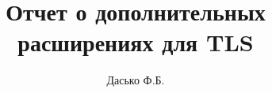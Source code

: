 \documentclass[12pt,a4paper]{article}
\title{Отчет о дополнительных расширениях для TLS}
\author{Дасько Ф.Б.}
\begin{document}
\maketitle

\begin{abstract}
%



\end{abstract}
\end{document}

